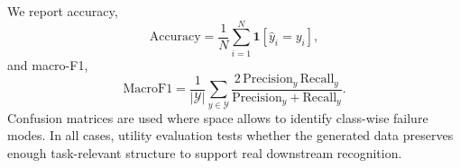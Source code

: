 We report accuracy,
\begin{equation}
    \mathrm{Accuracy}
    =
    \frac{1}{N}
    \sum_{i=1}^{N}\mathbf{1}[\hat{y}_i=y_i],
\end{equation}
and macro-F1,
\begin{equation}
    \mathrm{MacroF1}
    =
    \frac{1}{|\mathcal{Y}|}
    \sum_{y\in\mathcal{Y}}
    \frac{2\,\mathrm{Precision}_y\,\mathrm{Recall}_y}
    {\mathrm{Precision}_y+\mathrm{Recall}_y}.
\end{equation}
Confusion matrices are used where space allows to identify class-wise failure
modes. In all cases, utility evaluation tests whether the generated data
preserves enough task-relevant structure to support real downstream recognition.

%
%
%
%
%
